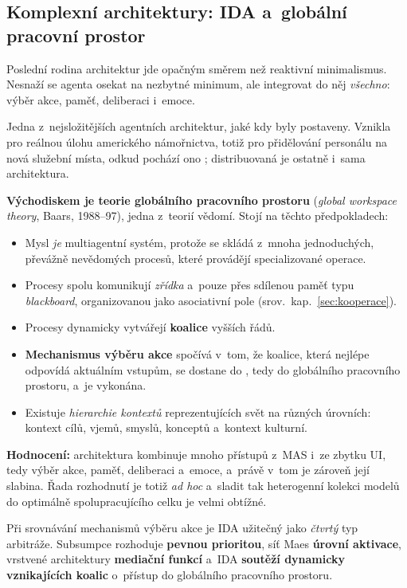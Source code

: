 \documentclass[11pt,a4paper]{article}
\theoremstyle{definition}
\begin{document}
\subsection{Komplexní architektury: IDA a~globální pracovní prostor}
\label{ssec:ida}

Poslední rodina architektur jde opačným směrem než reaktivní minimalismus. Nesnaží se agenta
osekat na nezbytné minimum, ale integrovat do něj \emph{všechno}: výběr akce, paměť, deliberaci
i~emoce.

\begin{defbox}
Jedna z~nejsložitějších agentních architektur, jaké kdy byly postaveny. Vznikla pro reálnou
úlohu amerického námořnictva, totiž pro přidělování personálu na nová služební místa, odkud
pochází ono ; distribuovaná je ostatně i~sama architektura.

\textbf{Východiskem je teorie globálního pracovního prostoru} (\emph{global workspace theory},
Baars, 1988--97), jedna z~teorií vědomí. Stojí na těchto předpokladech:
\begin{itemize}
\item Mysl \emph{je} multiagentní systém, protože se skládá z~mnoha jednoduchých, převážně
  nevědomých procesů, které provádějí specializované operace.
\item Procesy spolu komunikují \emph{zřídka} a~pouze přes sdílenou paměť typu \emph{blackboard},
  organizovanou jako asociativní pole (srov.\ kap.~\ref{sec:kooperace}).
\item Procesy dynamicky vytvářejí \textbf{koalice} vyšších řádů.
\item \textbf{Mechanismus výběru akce} spočívá v~tom, že koalice, která nejlépe odpovídá
  aktuálním vstupům, se dostane do , tedy do globálního pracovního prostoru,
  a~je vykonána.
\item Existuje \emph{hierarchie kontextů} reprezentujících svět na různých úrovních: kontext
  cílů, vjemů, smyslů, konceptů a~kontext kulturní.
\end{itemize}
\textbf{Hodnocení:} architektura kombinuje mnoho přístupů z~MAS i~ze zbytku UI, tedy výběr
akce, paměť, deliberaci a~emoce, a~právě v~tom je zároveň její slabina. Řada rozhodnutí je
totiž \emph{ad hoc} a~sladit tak heterogenní kolekci modelů do optimálně spolupracujícího
celku je velmi obtížné.
\end{defbox}

Při srovnávání mechanismů výběru akce je IDA užitečný jako \emph{čtvrtý} typ arbitráže.
Subsumpce rozhoduje \textbf{pevnou prioritou}, síť Maes \textbf{úrovní aktivace}, vrstvené
architektury \textbf{mediační funkcí} a~IDA \textbf{soutěží dynamicky vznikajících koalic}
o~přístup do globálního pracovního prostoru.
\end{document}
